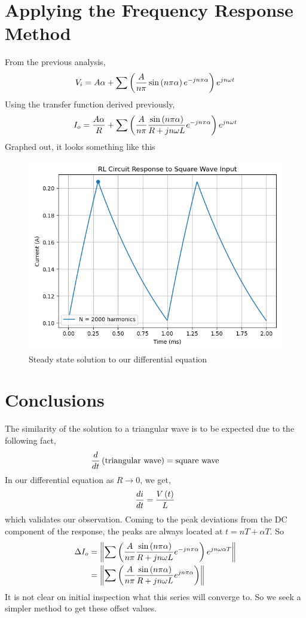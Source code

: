 \section{Applying the Frequency Response Method}
    From the previous analysis,
    \begin{align*}
        V_i = A\alpha + \sum \left(\frac{A}{n\pi}\sin\left(n\pi\alpha\right)e^{-jn\pi\alpha}\right)e^{jn\omega t}
    \end{align*}
    Using the transfer function derived previously, 
    \begin{align*}
        I_o = \frac{A\alpha}{R}  + \sum \left(\frac{A}{n\pi}\frac{\sin\left(n\pi\alpha\right)}{R + {jn\omega L}}e^{-jn\pi\alpha}\right)e^{jn\omega t}
    \end{align*}
    Graphed out, it looks something like this
    \begin{figure}
        \centering
        \includegraphics[width=0.8\linewidth]{figs/steady-state.png}
        \caption{Steady state solution to our differential equation}
    \end{figure}
\section{Conclusions}
    The similarity of the solution to a triangular wave is to be expected due to the following fact, 
    \begin{align*}
        \frac{d}{dt}\left(\text{triangular wave}\right) = \text{square wave}
    \end{align*}
    In our differential equation as $R \rightarrow 0$, we get,
    \begin{align*}
        \frac{di}{dt} = \frac{V\left(t\right)}{L}
    \end{align*}
    which validates our observation.
    \newline
    Coming to the peak deviations from the DC component of the response, the peaks are always located at $t = nT + \alpha T$. So
    \begin{align*}
        \Delta I_o &= \left \|\sum \left(\frac{A}{n\pi}\frac{\sin\left(n\pi\alpha\right)}{R + {jn\omega L}}e^{-jn\pi\alpha}\right)e^{jn\omega \alpha T} \right\|\\
        &=  \left\| \sum\left(\frac{A}{n\pi}\frac{\sin\left(n\pi\alpha\right)}{R + {jn\omega L}}e^{jn\pi\alpha}\right) \right \| \\
    \end{align*}
    It is not clear on initial inspection what this series will converge to. So we seek a simpler method to get these offset values.
